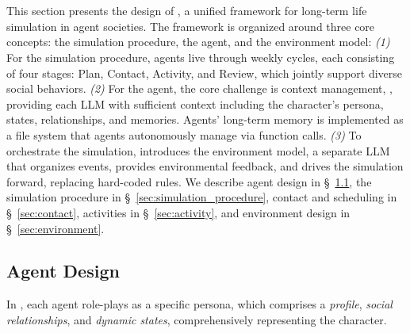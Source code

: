 
\section{\method}
\label{sec:framework}


This section presents the design of \method,
a unified framework for long-term life simulation in agent societies.
The framework is organized around three core concepts: the simulation procedure, the agent, and the environment model:
\textit{(1)} For the simulation procedure, agents live through weekly cycles, each consisting of four stages: Plan, Contact, Activity, and Review, which jointly support diverse social behaviors.
\textit{(2)} For the agent, the core challenge is context management, \ie, providing each LLM with sufficient context including the character's persona, states, relationships, and memories. 
Agents' long-term memory is implemented as a file system that agents autonomously manage via function calls. 
\textit{(3)} To orchestrate the simulation, \method introduces the environment model, a separate LLM that organizes events, provides environmental feedback, and drives the simulation forward, replacing hard-coded rules.
We describe agent design in \S~\ref{sec:agent_design},
the simulation procedure in \S~\ref{sec:simulation_procedure},
contact and scheduling in \S~\ref{sec:contact},
activities in \S~\ref{sec:activity},
and environment design in \S~\ref{sec:environment}.

\subsection{Agent Design}
\label{sec:agent_design}

In \method, each agent role-plays as a specific persona, which comprises a \textit{profile}, \textit{social relationships}, and \textit{dynamic states}, comprehensively representing the character.


